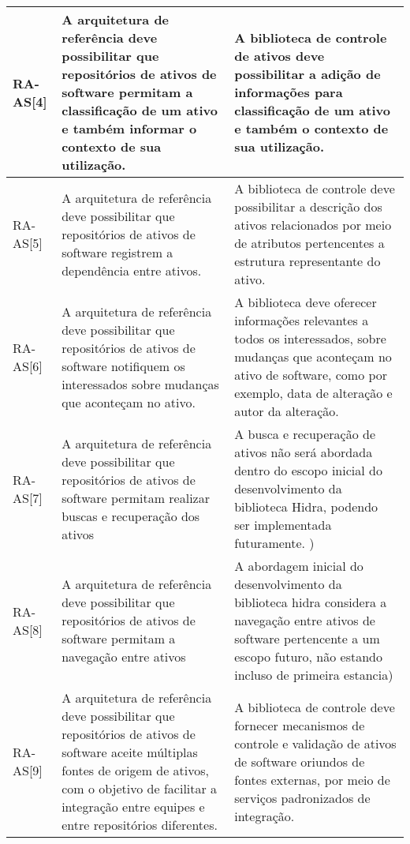 \begin{longtable}{ | l | p{7cm} | p{7cm} |}
    RA-AS[4] 
    & A arquitetura de referência deve possibilitar que repositórios de ativos de software permitam a classificação de um ativo e também informar o contexto de sua utilização.
    & A biblioteca de controle de ativos deve possibilitar a adição de informações para classificação de um ativo e também o contexto de sua utilização. \\ \hline

     RA-AS[5] 
     & A arquitetura de referência deve possibilitar que repositórios de ativos de software registrem a dependência entre ativos.
     & A biblioteca de controle deve possibilitar a descrição dos ativos relacionados por meio de atributos pertencentes a estrutura representante do ativo.
 \\ \hline

    RA-AS[6] 
    & A arquitetura de referência deve possibilitar que repositórios de ativos de software notifiquem os interessados sobre mudanças que aconteçam no ativo. 
    & A biblioteca deve oferecer informações relevantes a todos os interessados, sobre mudanças que aconteçam no ativo de software, como por exemplo, data de alteração e autor da alteração.
 \\ \hline
 
    RA-AS[7] 
    & A arquitetura de referência deve possibilitar que  repositórios de ativos de software permitam realizar  buscas e recuperação dos ativos 
    & A busca e recuperação de ativos não será abordada dentro do escopo inicial do desenvolvimento da biblioteca Hidra, podendo ser implementada futuramente. ) \\ \hline
    
    RA-AS[8] 
    & A arquitetura de referência deve possibilitar que  repositórios de ativos de software permitam a  navegação entre ativos 
    & A abordagem inicial do desenvolvimento da biblioteca hidra considera a navegação entre ativos de software pertencente a um escopo futuro, não estando incluso de primeira estancia) \\ \hline
    
    RA-AS[9] 
    & A arquitetura de referência deve possibilitar que  repositórios de ativos de software aceite múltiplas  fontes de origem de ativos, com o objetivo de facilitar  a integração entre equipes e entre repositórios  diferentes.  
    & A biblioteca de controle  deve fornecer mecanismos de controle e validação de ativos de software oriundos de fontes externas, por meio de serviços padronizados de integração.
 \\ \hline
 

\end{longtable}
